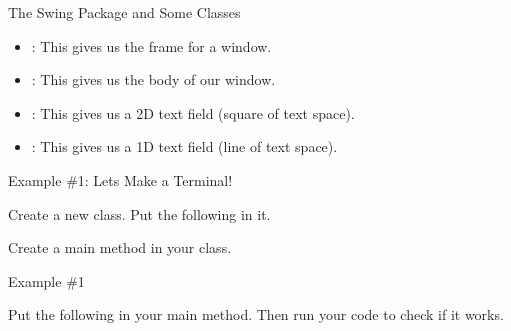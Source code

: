 \begin{frame}{The Swing Package and Some Classes}
\begin{itemize}
\item {}: This gives us the frame for a window.\pause
\item {}: This gives us the body of our window.\pause
\item {}: This gives us a 2D text field (square of text space).\pause
\item {}: This gives us a 1D text field (line of text space).
\end{itemize}
\end{frame}

\begin{frame}[fragile]{Example \#1: Lets Make a Terminal!}
\begin{center}Create a new class. Put the following in it.\end{center}
\begin{semiverbatim}\end{semiverbatim}\pause
\begin{center}Create a main method in your class.\end{center}
\end{frame}


\begin{frame}[fragile]{Example \#1}
\begin{center}
Put the following in your main method. Then run your code to check if it works.
\end{center}
\begin{semiverbatim}\end{semiverbatim}
\end{frame}

